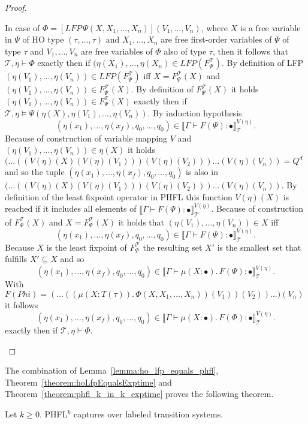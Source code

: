 \begin{proof}
\begin{compactitem}
        \item In case of $\Phi = [LFP\,\Psi(X, X_1, \dots, X_n)](V_1, \dots, V_n)$, where $X$ is a
        free variable in $\Psi$ of HO type $(\tau, \dots, \tau)$ and $X_1, \dots, X_n$ are free first-order
        variables of $\Psi$ of type $\tau$ and $V_1, \dots, V_n$ are free variables of $\Phi$ also of type $\tau$, then
        it follows that $\mathcal{T}, \eta \vdash \Phi$ exactly then if $(\eta(X_1), \dots, \eta(X_n) \in LFP
        (F_\Psi^\mathcal{T})$. By definition of LFP $(\eta(V_1), \dots, \eta(V_n)) \in
        LFP(F_\Psi^\mathcal{T})$ iff $X = F_\Psi^\mathcal{T}(X)$ and $(\eta(V_1), \dots, \eta(V_n)) \in
        F_\Psi^\mathcal{T}(X)$. By definition of $F_\Psi^\mathcal{T}(X)$ it holds $(\eta
        (V_1), \dots, \eta(V_n)) \in F_\Psi^\mathcal{T}(X)$ exactly then if $\mathcal{T}, \eta \models \Psi
        (\eta(X), \eta(V_1), \dots, \eta(V_n))$. By induction hypothesis
        \[(\eta(x_1), \dots, \eta(x_f), q_0, \dots, q_0) \in \llbracket \Gamma \vdash F(\Psi) \colon \bullet
        \rrbracket^{V(\eta)}_\mathcal{T}.\]
        Because of construction of variable mapping $V$ and $(\eta(V_1), \dots, \eta(V_n)) \in \eta(X)$ it holds
        $(\dots((V(\eta)(X)(V(\eta)(V_1)))(V(\eta)(V_2))) \dots (V(\eta)(V_n)) = Q^d$
        and so the tuple $(\eta(x_1), \dots, \eta(x_f), q_0, \dots, q_0)$ is also in $(\dots((V(\eta)(X)(V(\eta)(V_1)
        ))(V(\eta)(V_2))) \dots (V(\eta)(V_n))$. By definition of the least fixpoint operator in PHFL this function
        $V(\eta)(X)$ is reached if it includes all
        elements of $\llbracket \Gamma \vdash F(\Psi) \colon \bullet \rrbracket^{V(\eta)}_\mathcal{T}$. Because of
        construction of $F_\Psi^\mathcal{T}(X)$ and $X = F_\Psi^\mathcal{T}(X)$ it holds that $(\eta(V_{1}),
        \dots, \eta(V_{n})) \in X$ iff
        \[(\eta(x_1), \dots, \eta(x_f), q_0, \dots, q_0) \in \llbracket
        \Gamma \vdash F(\Psi) \colon \bullet \rrbracket^{V(\eta)}_\mathcal{T}.\]
        Because $X$ is the least fixpoint of $F_\Psi^\mathcal{T}$ the resulting set $X'$ is the smallest set that
        fulfills $X' \subseteq X$ and so
        \[(\eta(x_{1}), \dots, \eta(x_f), q_0, \dots, q_0) \in \llbracket
        \Gamma \vdash \mu(X\colon \bullet).\,F(\Psi) \colon \bullet \rrbracket^{V(\eta)}_\mathcal{T}.\]
        With $F(Phi) = (\dots ((\mu (X \colon T(\tau)).\,\Phi(X, X_1, \dots, X_n))(V_1))(V_2))\dots)(V_n)$ it follows
        \[(\eta(x_{1}), \dots, \eta(x_f), q_0, \dots, q_0) \in \llbracket
        \Gamma \vdash \mu(X\colon \bullet).\,F(\Phi) \colon \bullet \rrbracket^{V(\eta)}_\mathcal{T}.\]
        exactly then if $\mathcal{T}, \eta \vdash \Phi$.
    \end{compactitem}
\end{proof}

The combination of Lemma~\ref{lemma:ho_lfp_equals_phfl}, Theorem~\ref{theorem:hoLfpEqualsExptime} and
Theorem~\ref{theorem:phfl_k_in_k_exptime} proves the following theorem.

\begin{theorem}
    Let $k \geq 0$. PHFL$^k$ captures  over labeled transition systems.
\end{theorem}

